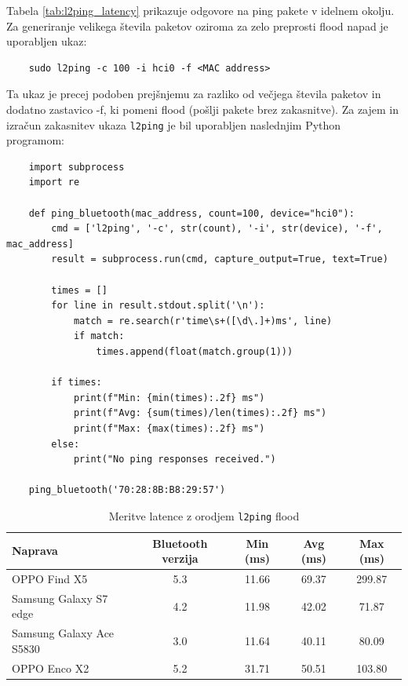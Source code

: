 \documentclass[11pt,a4paper,slovene]{article}
\begin{document}
Tabela \ref{tab:l2ping_latency} prikazuje odgovore na ping pakete v idelnem okolju. Za generiranje velikega števila paketov oziroma za zelo preprosti flood napad je uporabljen ukaz:

\begin{verbatim}
	sudo l2ping -c 100 -i hci0 -f <MAC address>
\end{verbatim}

Ta ukaz je precej podoben prejšnjemu za razliko od večjega števila paketov in dodatno zastavico -f, ki pomeni flood (pošlji pakete brez zakasnitve). Za zajem in izračun zakasnitev ukaza \texttt{l2ping} je bil uporabljen naslednjim Python programom:
\begin{verbatim}
	import subprocess
	import re
	
	def ping_bluetooth(mac_address, count=100, device="hci0"):
		cmd = ['l2ping', '-c', str(count), '-i', str(device), '-f', mac_address]
		result = subprocess.run(cmd, capture_output=True, text=True)
	
		times = []
		for line in result.stdout.split('\n'):
			match = re.search(r'time\s+([\d\.]+)ms', line)
			if match:
				times.append(float(match.group(1)))
	
		if times:
			print(f"Min: {min(times):.2f} ms")
			print(f"Avg: {sum(times)/len(times):.2f} ms")
			print(f"Max: {max(times):.2f} ms")
		else:
			print("No ping responses received.")
	
	ping_bluetooth('70:28:8B:B8:29:57')
\end{verbatim}

\begin{table}[H]
	\centering
	\small
	\renewcommand{\arraystretch}{1.2}
	\begin{tabular}{|l|c|c|c|c|}
		\hline
		\textbf{Naprava} & \textbf{Bluetooth verzija} & \textbf{Min (ms)} & \textbf{Avg (ms)} & \textbf{Max (ms)} \\
		\hline
		OPPO Find X5 & 5.3 & 11.66 & 69.37 & 299.87 \\
		\hline
		Samsung Galaxy S7 edge & 4.2 & 11.98 & 42.02 & 71.87 \\
		\hline
		Samsung Galaxy Ace S5830 & 3.0 & 11.64 & 40.11 & 80.09 \\
		\hline
		OPPO Enco X2 & 5.2 & 31.71 & 50.51 & 103.80 \\
		\hline
	\end{tabular}
	\caption{Meritve latence z orodjem \texttt{l2ping} flood}
	\label{tab:l2ping_latency_flood}
\end{table}
\end{document}
